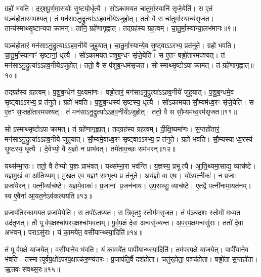 ग्रहो॑ भवति।
द॒र्‌॒\mbox{}श॒पू॒र्ण॒मा॒सयोः᳚ सृ॒ष्टयो॒र्धृत्यै।
सो॑ऽकामयत चातुर्मा॒स्यानि॑ सृजे॒येति॑।
स ए॒तं पञ्च॑होतारमपश्यत्।
तं मन॑सा\-ऽनु॒द्रुत्या॑\-ऽऽहव॒नीये॑\-ऽजुहोत्।
ततो॒ वै स चा॑तुर्मा॒स्यान्य॑सृजत।
तान्य॑स्माथ्सृ॒ष्टान्यपाक्रामन्।
तानि॒ ग्रहे॑णागृह्णात्।
तद्ग्रह॑स्य ग्रह॒त्वम्।
चा॒तु॒र्मा॒स्यान्या॒लभ॑मानः॥९॥

पञ्च॑होतारं॒ मन॑सा\-ऽनु॒द्रुत्या॑\-ऽऽहव॒नीये॑ जुहुयात्।
चा॒तु॒र्मा॒स्या\-न्ये॒व सृ॒ष्ट्वा\-ऽऽरभ्य॒ प्रत॑नुते।
ग्रहो॑ भवति।
चा॒तु॒र्मा॒स्यानाꣳ॑ सृ॒ष्टानां॒ धृत्यै।
सो॑ऽकामयत पशुब॒न्धꣳ सृ॑जे॒येति॑।
स ए॒तꣳ षड्ढो॑तारमपश्यत्।
तं मन॑सा\-ऽनु॒द्रुत्या॑\-ऽऽहव॒नीये॑\-ऽजुहोत्।
ततो॒ वै स प॑शुब॒न्धम॑सृजत।
सोस्माथ्सृ॒ष्टो\-ऽपाक्रामत्।
तं ग्रहे॑णागृह्णात्॥१०॥

तद्ग्रह॑स्य ग्रह॒त्वम्।
प॒शु॒ब॒न्धेन॑ य॒क्ष्यमा॑णः।
षड्ढो॑तारं॒ मन॑सा\-ऽनु॒द्रुत्या॑\-ऽऽहव॒नीये॑ जुहुयात्।
प॒शु॒ब॒न्धमे॒व सृ॒ष्ट्वा\-ऽऽरभ्य॒ प्र त॑नुते।
ग्रहो॑ भवति।
प॒शु॒ब॒न्धस्य॑ सृ॒ष्टस्य॒ धृत्यै।
सो॑ऽकामयत सौ॒म्यम॑ध्व॒रꣳ सृ॑जे॒येति॑।
स ए॒तꣳ स॒प्तहो॑तारमपश्यत्।
तं मन॑सा\-ऽनु॒द्रुत्या॑\-ऽऽहव॒नीये॑\-ऽजुहोत्।
ततो॒ वै स सौ॒म्यम॑ध्व॒रम॑सृजत॥११॥

सोऽस्माथ्सृ॒ष्टो\-ऽपाक्रामत्।
तं ग्रहे॑णागृह्णात्।
तद्ग्रह॑स्य ग्रह॒त्वम्।
दी॒क्षि॒ष्यमा॑णः।
स॒प्तहो॑तारं॒ मन॑सा\-ऽनु॒द्रुत्या॑\-ऽऽहव॒नीये॑ जुहुयात्।
सौ॒म्यमे॒वाध्व॒रꣳ सृ॒ष्ट्वा\-ऽऽरभ्य॒ प्र त॑नुते।
ग्रहो॑ भवति।
सौ॒म्यस्याध्व॒रस्य॑ सृ॒ष्टस्य॒ धृत्यै।
दे॒वेभ्यो॒ वै य॒ज्ञो न प्राभ॑वत्।
तमे॑ताव॒च्छः सम॑भरन्॥१२॥

यथ्स॑म्भा॒राः।
ततो॒ वै तेभ्यो॑ य॒ज्ञः प्राभ॑वत्।
यथ्स॑म्भा॒रा भव॑न्ति।
य॒ज्ञस्य॒ प्रभूत्यै।
आ॒ति॒थ्यमा॒साद्य॒ व्याच॑ष्टे।
य॒ज्ञ॒मु॒खं वा आ॑ति॒थ्यम्।
मु॒ख॒त ए॒व य॒ज्ञꣳ स॒म्भृत्य॒ प्र त॑नुते।
अय॑ज्ञो॒ वा ए॒षः।
यो॑ऽप॒त्नीकः॑।
न प्र॒जाः प्रजा॑येरन्।
पत्नी॒र्व्याच॑ष्टे।
य॒ज्ञमे॒वाकः॑।
प्र॒जानां प्र॒जन॑नाय।
उ॒प॒सथ्सु॒ व्याच॑ष्टे।
ए॒तद्वै पत्नी॑नामा॒यत॑नम्।
स्व ए॒वैना॑ आ॒यत॒ने\-ऽव॑कल्पयति॥१३॥\anuvakamend[त॒नु॒त॒ आ॒लभ॑मानो\-ऽगृह्णादसृजताभरञ्जायेर॒न्थ्षट्च॑]

प्र॒जाप॑तिरकामयत॒ प्रजा॑ये॒येति॑।
स तपो॑\-ऽतप्यत।
स त्रि॒वृत॒ꣴ॒ स्तोम॑मसृजत।
तं प॑ञ्चद॒शः स्तोमो॑ मध्य॒त उद॑तृणत्।
तौ पूर्वप॒क्षश्चा॑परप॒क्षश्चा॑भवताम्।
पू॒र्व॒प॒क्षं दे॒वा अन्वसृ॑ज्यन्त।
अ॒प॒र॒प॒क्षमन्वसु॑राः।
ततो॑ दे॒वा अभ॑वन्।
पराऽसु॑राः।
यं का॒मये॑त॒ वसी॑यान्थ्स्या॒दिति॑॥१४॥

तं पूर्वप॒क्षे या॑जयेत्।
वसी॑याने॒व भ॑वति।
यं का॒मये॑त॒ पापी॑यान्थ्स्या॒दिति॑।
तम॑परप॒क्षे या॑जयेत्।
पापी॑याने॒व भ॑वति।
तस्मात्पूर्वप॒क्षो॑\-ऽपरप॒क्षात्क॑रु॒ण्य॑तरः।
प्र॒जाप॑ति॒र्वै दश॑होता।
चतु॑र्‌\mbox{}होता॒ पञ्च॑होता।
षड्ढो॑ता स॒प्तहो॑ता।
ऋ॒तवः॑ संवथ्स॒रः॥१५॥

